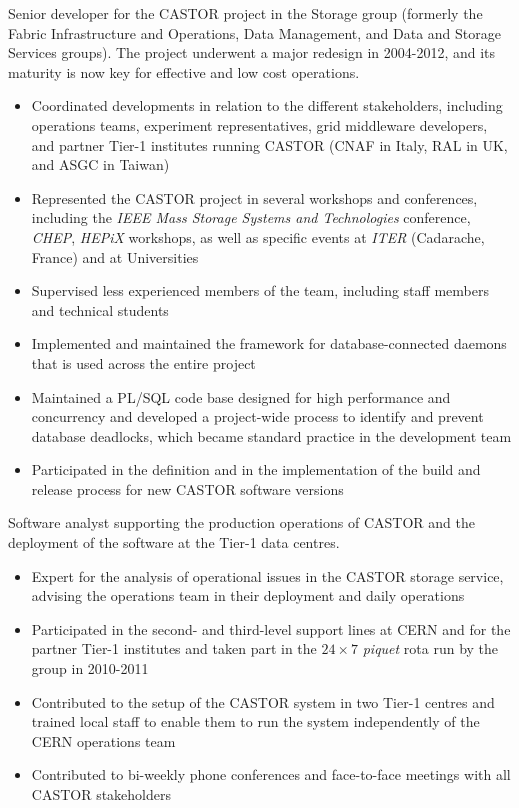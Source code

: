 \documentclass[11pt]{article}
\newenvironment{CompactItemize} {
  \begin{itemize}
  \setlength{\itemsep}{-3pt}
  \setlength{\parsep}{0pt}
  \setlength{\topsep}{-2pt}
  \setlength{\partopsep}{-2pt}
} {\end{itemize}}
\begin{document}
Senior developer for the CASTOR project in the Storage group (formerly the Fabric Infrastructure and Operations, Data Management, and Data and Storage Services groups).
The project underwent a major redesign in 2004-2012, and its maturity is now key for effective and low cost operations.

\begin{CompactItemize}
\item Coordinated developments in relation to the different stakeholders, including
  operations teams, experiment representatives, grid middleware developers, and partner Tier-1
  institutes running CASTOR (CNAF in Italy, RAL in UK, and ASGC in Taiwan)
\item Represented the CASTOR project in several workshops and conferences, including the
\emph{IEEE Mass Storage Systems and Technologies} conference, \emph{CHEP}, \emph{HEPiX} workshops, as well as specific events at \emph{ITER} (Cadarache, France) and at Universities
\item Supervised less experienced members of the team, including staff members and technical students
\item Implemented and maintained the framework for database-connected daemons that is used
  across the entire project
\item Maintained a PL/SQL code base designed for high performance and concurrency and developed a
  project-wide process to identify and prevent database deadlocks, which became standard practice in the development team
\item Participated in the definition and in the implementation of the build and release process
  for new CASTOR software versions
\end{CompactItemize}

Software analyst supporting the production operations of CASTOR and the
deployment of the software at the Tier-1 data centres.

\begin{CompactItemize}
\item Expert for the analysis of operational issues in the CASTOR storage service, advising
  the operations team in their deployment and daily operations
\item Participated in the second- and third-level support lines at CERN and for the partner Tier-1
  institutes and taken part in the $24\times7$ \emph{piquet} rota run by the group in 2010-2011
\item Contributed to the setup of the CASTOR system in two Tier-1 centres and trained local
  staff to enable them to run the system independently of the CERN operations team
\item Contributed to bi-weekly phone conferences and face-to-face meetings with all CASTOR stakeholders
\end{CompactItemize}
\end{document}
